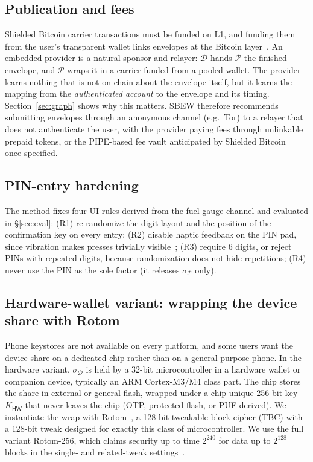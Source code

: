 \documentclass[11pt]{article}
\theoremstyle{remark}
\newcommand{\SB}{Shielded Bitcoin}
\newcommand{\sysname}{\textsf{SBEW}}
\begin{document}
\subsection{Publication and fees}
\SB{} carrier transactions must be funded on L1, and funding them from the user's transparent wallet links envelopes at the Bitcoin layer~\cite[§20.5]{sb26}. An embedded provider is a natural sponsor and relayer: $\mathcal{D}$ hands $\mathcal{P}$ the finished envelope, and $\mathcal{P}$ wraps it in a carrier funded from a pooled wallet. The provider learns nothing that is not on chain about the envelope itself, but it learns the mapping from the \emph{authenticated account} to the envelope and its timing. Section~\ref{sec:graph} shows why this matters. \sysname{} therefore recommends submitting envelopes through an anonymous channel (e.g.\ Tor) to a relayer that does not authenticate the user, with the provider paying fees through unlinkable prepaid tokens, or the PIPE-based fee vault anticipated by \SB{}~\cite[§20.5]{sb26} once specified.

\subsection{PIN-entry hardening}
The method fixes four UI rules derived from the fuel-gauge channel and evaluated in §\ref{sec:eval}: (R1) re-randomize the digit layout and the position of the confirmation key on every entry; (R2) disable haptic feedback on the PIN pad, since vibration makes presses trivially visible~\cite{gn23}; (R3) require 6 digits, or reject PINs with repeated digits, because randomization does not hide repetitions; (R4) never use the PIN as the sole factor (it releases $\sigma_{\mathcal{P}}$ only).

\subsection{Hardware-wallet variant: wrapping the device share with Rotom}
\label{sec:hw}
Phone keystores are not available on every platform, and some users want the device share on a dedicated chip rather than on a general-purpose phone. In the hardware variant, $\sigma_{\mathcal{D}}$ is held by a 32-bit microcontroller in a hardware wallet or companion device, typically an ARM Cortex-M3/M4 class part. The chip stores the share in external or general flash, wrapped under a chip-unique 256-bit key $K_{\mathsf{HW}}$ that never leaves the chip (OTP, protected flash, or PUF-derived). We instantiate the wrap with Rotom~\cite{rotom26}, a 128-bit tweakable block cipher (TBC) with a 128-bit tweak designed for exactly this class of microcontroller. We use the full variant Rotom-256, which claims security up to time $2^{240}$ for data up to $2^{128}$ blocks in the single- and related-tweak settings~\cite[§2.4]{rotom26}.
\end{document}
